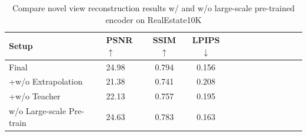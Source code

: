 \begin{table}[ht!]
    \begin{center}
    \begin{tabular}{llccccccccccc}
    \toprule
    Setup  & PSNR$\uparrow$ & SSIM$\uparrow$ & LPIPS$\downarrow$ \\
    \midrule
    \cellcolor{Gray}Final & \cellcolor{Gray}24.98 & \cellcolor{Gray}0.794 & \cellcolor{Gray}0.156 \\
    +w/o Extrapolation & 21.38 & 0.741 & 0.208 \\
    +w/o Teacher & 22.13  & 0.757  & 0.195 \\
    \midrule
    w/o Large-scale Pre-train & 24.63  & 0.783  & 0.163 \\
    
    \bottomrule
    \end{tabular}
    \end{center}
    \caption{Compare novel view reconstruction results w/ and w/o large-scale pre-trained encoder on RealEstate10K}
    \label{tab:dinov1}
    \vspace{-0.1in}
    
\end{table}